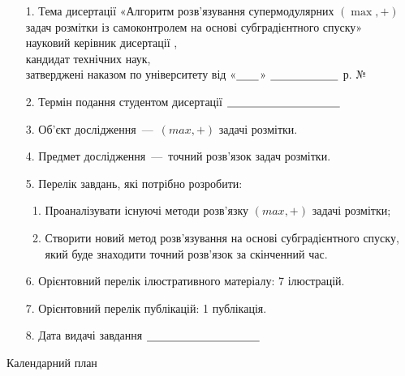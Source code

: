 \begin{enumerate}
    \item[1.]
        Тема дисертації «Алгоритм розв’язування супермодулярних $(\max, +)$ задач розмітки із самоконтролем на основі субградієнтного спуску» \\
        науковий керівник дисертації \mentorName, \\
        кандидат технічних наук, \\
        затверджені наказом по університету від
        «${\text{\underline{\hspace{2em}}}}$»
        ${\text{\underline{\hspace{6em}}}}$  \passYear р. №
    \item[2.]
        Термін подання студентом дисертації ${\text{\underline{\hspace{10em}}}}$
    \item[3.]
        Об’єкт дослідження~---~$(max ,+)$ задачі розмітки.
    \item[4.]
        Предмет дослідження~---~точний розв’язок задач розмітки.
    \item[5.]
        Перелік завдань, які потрібно розробити:
        \begin{enumerate}
            \item
            Проаналізувати існуючі методи розв’язку $(max ,+)$ задачі розмітки;
            \item
            Створити новий метод розв’язування на основі субградієнтного
            спуску, який буде знаходити точний розв’язок за скінченний час.
        \end{enumerate}
    \item[6.]
        Орієнтовний перелік ілюстративного матеріалу: 7 ілюстрацій.
    \item[7.]
        Орієнтовний перелік публікацій: 1 публікація.
    \item[8.]
        Дата видачі завдання ${\text{\underline{\hspace{10em}}}}$
\end{enumerate}

\begin{center}
    Календарний план
\end{center}

